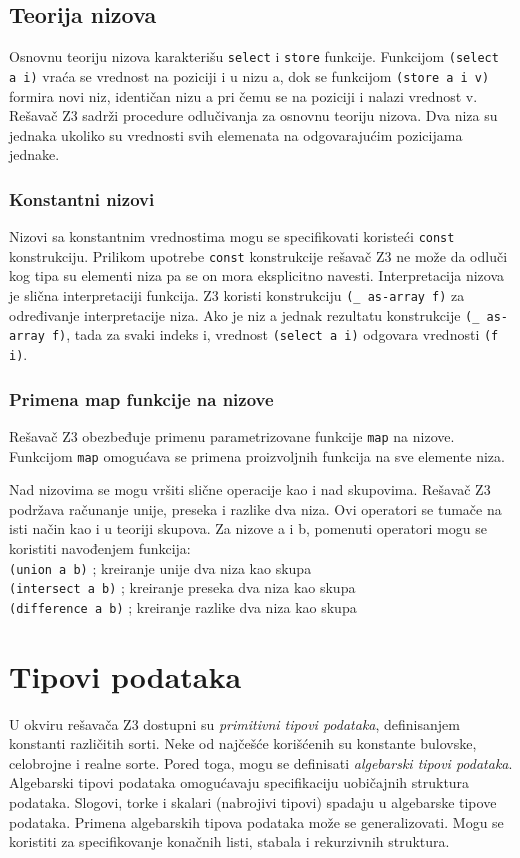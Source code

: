 \documentclass[12pt,oneside]{memoir}
\begin{document}
\subsection{Teorija nizova} 
Osnovnu teoriju nizova karakterišu \texttt{select} i \texttt{store} funkcije. 
Funkcijom \texttt{(select a i)} vraća se vrednost na poziciji i u nizu a, dok se funkcijom \texttt{(store a i v)} formira novi niz, identičan nizu a pri čemu se na poziciji i nalazi vrednost v.
Rešavač Z3 sadrži procedure odlučivanja za osnovnu teoriju nizova.
Dva niza su jednaka ukoliko su vrednosti svih elemenata na odgovarajućim pozicijama jednake.
 

\subsubsection{Konstantni nizovi}

Nizovi sa konstantnim vrednostima mogu se specifikovati koristeći \texttt{const} konstrukciju. Prilikom upotrebe \texttt{const} konstrukcije rešavač Z3 ne može da odluči kog tipa su elementi niza pa se on mora eksplicitno navesti. Interpretacija nizova je slična interpretaciji funkcija. Z3 koristi konstrukciju \texttt{(\_ as-array f)} za određivanje interpretacije niza. Ako je niz a jednak rezultatu konstrukcije \texttt{(\_ as-array f)}, tada za svaki indeks i, vrednost \texttt{(select a i)} odgovara vrednosti \texttt{(f i)}. 


\subsubsection{Primena map funkcije na nizove}
Rešavač Z3 obezbeđuje primenu parametrizovane funkcije \texttt{map} na nizove. Funkcijom \texttt{map} omogućava se primena proizvoljnih funkcija na sve elemente niza.

Nad nizovima se mogu vršiti slične operacije kao i nad skupovima. Rešavač Z3 podržava računanje unije, preseka i razlike dva niza. Ovi operatori se tumače na isti način kao i u teoriji skupova. Za nizove a i b, pomenuti operatori mogu se koristiti navođenjem funkcija:\\
\texttt{(union a b)} ; kreiranje unije dva niza kao skupa \\
\texttt{(intersect a b)} ; kreiranje preseka dva niza kao skupa \\
\texttt{(difference a b)} ; kreiranje razlike dva niza kao skupa

\section{Tipovi podataka} \label{sec:num3}
U okviru rešavača Z3 dostupni su \emph{primitivni tipovi podataka}, definisanjem konstanti različitih sorti. Neke od najčešće korišćenih su konstante bulovske, celobrojne i realne sorte.
Pored toga, mogu se definisati \emph{algebarski tipovi podataka}. Algebarski tipovi podataka omogućavaju specifikaciju uobičajnih struktura podataka. Slogovi, torke i skalari (nabrojivi tipovi) spadaju u algebarske tipove podataka. Primena algebarskih tipova podataka može se generalizovati. Mogu se koristiti za specifikovanje konačnih listi, stabala i rekurzivnih struktura. 
\end{document}
